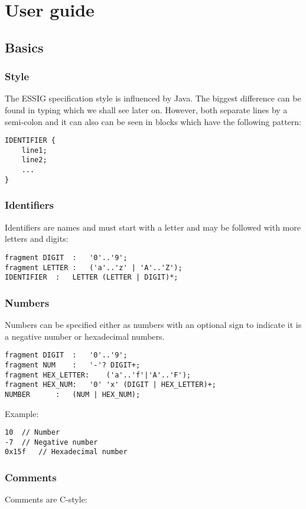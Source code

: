 \chapter{User guide}
\section{Basics}
\subsection{Style}
The \ac{ESSIG} specification style is influenced by Java. The biggest
difference can be found in typing which we shall see later on. However, both
separate lines by a semi-colon and it can also can be seen in blocks which have
the following pattern:

\begin{lstlisting}
IDENTIFIER {
	line1;
	line2;
	...
}
\end{lstlisting}


\subsection[IDENTIFIER]{Identifiers}
Identifiers are names and must start with a letter and may be followed with
more letters and digits:

\begin{lstlisting}
fragment DIGIT	:	'0'..'9';
fragment LETTER	:	('a'..'z' | 'A'..'Z');
IDENTIFIER	:	LETTER (LETTER | DIGIT)*;
\end{lstlisting}

\subsection{Numbers}
Numbers can be specified either as numbers with an optional sign to indicate it
is a negative number or hexadecimal numbers.

\begin{lstlisting}
fragment DIGIT	:	'0'..'9';
fragment NUM	:	'-'? DIGIT+;
fragment HEX_LETTER:	('a'..'f'|'A'..'F');
fragment HEX_NUM:	'0' 'x' (DIGIT | HEX_LETTER)+;
NUMBER		:	(NUM | HEX_NUM);
\end{lstlisting}

Example:
\begin{lstlisting}
10	// Number
-7	// Negative number
0x15f	// Hexadecimal number
\end{lstlisting}

\subsection{Comments}
Comments are C-style:

